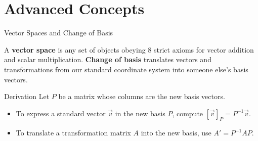 \documentclass[10pt, aspectratio=169]{beamer}
\begin{document}
\section{Advanced Concepts}

\begin{frame}{Vector Spaces and Change of Basis}
    \begin{definition}
        A \textbf{vector space} is any set of objects obeying 8 strict axioms for vector addition and scalar multiplication. \textbf{Change of basis} translates vectors and transformations from our standard coordinate system into someone else's basis vectors.
    \end{definition}

    \begin{block}{Derivation}
        Let $P$ be a matrix whose columns are the new basis vectors. 
        \begin{itemize}
            \item To express a standard vector $\vec{v}$ in the new basis $P$, compute $[\vec{v}]_P = P^{-1}\vec{v}$.
            \item To translate a transformation matrix $A$ into the new basis, use $A' = P^{-1} A P$.
        \end{itemize}
    \end{block}
\end{frame}
\end{document}
